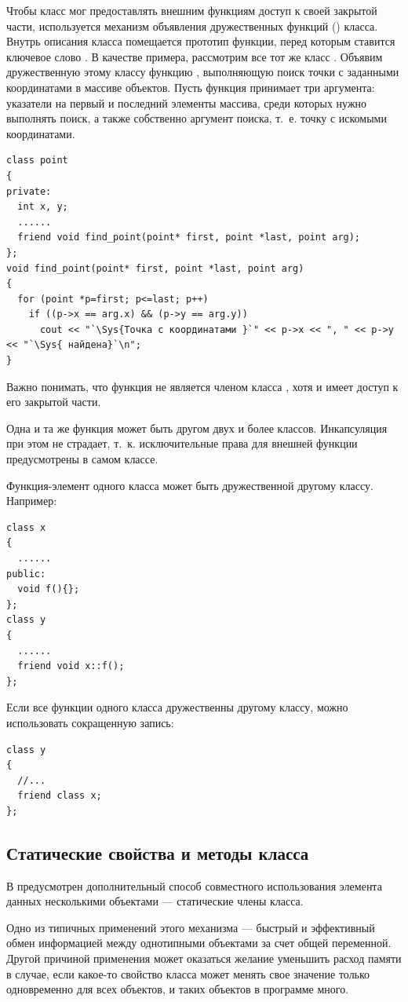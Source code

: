 Чтобы класс мог предоставлять внешним функциям доступ к своей закрытой части, используется механизм объявления
дружественных функций () класса. Внутрь  описания класса помещается прототип функции, перед
которым ставится ключевое слово . В качестве примера, рассмотрим все тот же класс
. Объявим дружественную этому классу функцию , выполняющую
поиск точки с заданными координатами в массиве объектов. Пусть функция принимает три аргумента: указатели на первый и
последний элементы массива, среди которых нужно выполнять поиск, а также собственно аргумент поиска, т.~е. точку с
искомыми координатами.
\begin{lstlisting}
class point 
{
private:
  int x, y;
  ......
  friend void find_point(point* first, point *last, point arg);
};
void find_point(point* first, point *last, point arg) 
{
  for (point *p=first; p<=last; p++) 
    if ((p->x == arg.x) && (p->y == arg.y)) 
      cout << "`\Sys{Точка с координатами }`" << p->x << ", " << p->y << "`\Sys{ найдена}`\n"; 
}
\end{lstlisting}

Важно понимать, что функция  не является членом класса
, хотя и имеет доступ к его закрытой части.

Одна и та же функция может быть другом двух и более классов. Инкапсуляция при этом не страдает, т.~к. исключительные
права для внешней функции предусмотрены в самом классе.

Функция-элемент одного класса может быть дружественной другому классу. Например:
\begin{lstlisting}
class x 
{
  ......
public:
  void f(){};
};
class y 
{
  ......
  friend void x::f();
};
\end{lstlisting}

Если все функции одного класса дружественны другому классу, можно использовать сокращенную запись:
\begin{lstlisting}
class y 
{
  //...
  friend class x;
};
\end{lstlisting}

\subsection[Статические свойства и методы класса]{Статические свойства и методы класса}
В  предусмотрен дополнительный способ совместного использования элемента данных  несколькими объектами --- статические
члены класса. 

Одно из типичных применений этого механизма --- быстрый и эффективный обмен информацией между однотипными объектами за
счет общей переменной. Другой причиной применения может оказаться желание уменьшить расход памяти в случае, если
какое-то свойство класса может менять свое значение только одновременно для всех объектов, и таких объектов в программе
много.

